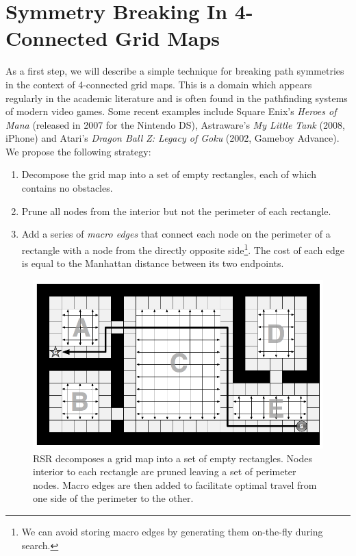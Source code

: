 \section{Symmetry Breaking In 4-Connected Grid Maps}
\label{cha::rsr::symm4c}

As a first step, we will describe a simple technique for breaking path symmetries 
in the context of 4-connected grid maps.
This is a domain which appears regularly in the academic literature
\citep{yap02,wang08,pochter10} and is often found in the pathfinding systems of
modern video games.  Some recent examples include Square Enix's \emph{Heroes of
Mana} (released in 2007 for the Nintendo DS), Astraware's \emph{My Little Tank}
(2008, iPhone) and Atari's \emph{Dragon Ball Z: Legacy of Goku} (2002, Gameboy
Advance). We propose the following strategy:

\begin{enumerate}
\item{Decompose the grid map into a set of empty rectangles, each of which contains no obstacles.}
\item{Prune all nodes from the interior but not the perimeter of each rectangle.}
\item{Add a series of \emph{macro edges} that connect each node on the perimeter of a rectangle
with a node from the directly opposite side\footnote{We can avoid storing macro edges by 
generating them on-the-fly during search.}.
The cost of each edge is equal to the Manhattan distance between its two endpoints.
}
\end{enumerate}

\begin{figure}[t]
\begin{center}
\includegraphics[scale=0.30, trim = 10mm 10mm 10mm 0mm]{chapter_rsr/diagrams/4c_example.png}
\end{center}
\vspace{-3pt}
\caption[Rectangular Symmetry Reduction on 4-connected maps]{
\small
RSR decomposes a grid map into a set of empty rectangles. 
Nodes interior to each rectangle are pruned leaving a set of perimeter nodes.
Macro edges are then added to facilitate optimal travel from one side of the perimeter to the other.}
\label{fig::rsr::overview}
\end{figure}

